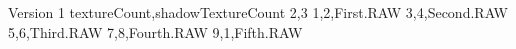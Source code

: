 Version
1
textureCount,shadowTextureCount
2,3
1,2,First.RAW
3,4,Second.RAW
5,6,Third.RAW
7,8,Fourth.RAW
9,1,Fifth.RAW
